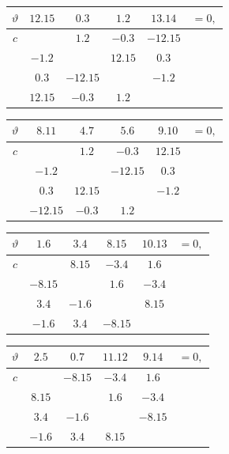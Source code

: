 \documentclass[11pt]{article}
\begin{document}
{\smallskip
\begin{center}
\begin{tabular}{c|cccc|c}\hline
$\vartheta$ & $12.15$ & $0.3$ & $1.2$ & $13.14$ & $=0,$\\\hline
$c$ & & $1.2$ & $-0.3$ & $-12.15$ & \\
& $-1.2$ & & $12.15$ & $0.3$ & \\
& $0.3$ & $-12.15$ & & $-1.2$ & \\
& $12.15$ & $-0.3$ & $1.2$ & & \\\hline
\end{tabular}
\hspace{0.8em}
\begin{tabular}{c|cccc|c}\hline
$\vartheta$ & $8.11$ & $4.7$ & $5.6$ & $9.10$ & $=0,$\\\hline
$c$ & & $1.2$ & $-0.3$ & $12.15$ & \\
& $-1.2$ & & $-12.15$ & $0.3$ & \\
& $0.3$ & $12.15$ & & $-1.2$ & \\
& $-12.15$ & $-0.3$ & $1.2$ & & \\\hline
\end{tabular}
\end{center}

\smallskip
\begin{center}
\begin{tabular}{c|cccc|c}\hline
$\vartheta$ & $1.6$ & $3.4$ & $8.15$ & $10.13$ & $=0,$\\\hline
$c$ & & $8.15$ & $-3.4$ & $1.6$ & \\
& $-8.15$ & & $1.6$ & $-3.4$ & \\
& $3.4$ & $-1.6$ & & $8.15$ & \\
& $-1.6$ & $3.4$ & $-8.15$ & & \\\hline
\end{tabular}
\hspace{0.8em}
\begin{tabular}{c|cccc|c}\hline
$\vartheta$ & $2.5$ & $0.7$ & $11.12$ & $9.14$ & $=0,$\\\hline
$c$ & & $-8.15$ & $-3.4$ & $1.6$ & \\
& $8.15$ & & $1.6$ & $-3.4$ & \\
& $3.4$ & $-1.6$ & & $-8.15$ & \\
& $-1.6$ & $3.4$ & $8.15$ & & \\\hline
\end{tabular}
\end{center}

}
\end{document}
